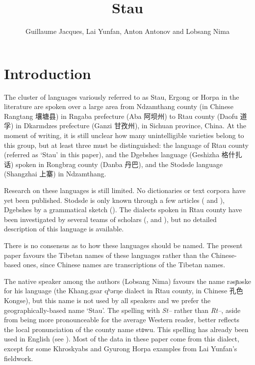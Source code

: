 \documentclass[oneside,a4paper,11pt]{article}
\newcommand{\ipa}[1]{{\phon #1}} %
\newcommand{\zh}[1]{{\cn #1}}
\begin{document}
 


\title{Stau}
\author{Guillaume Jacques, Lai Yunfan, Anton Antonov and Lobsang Nima}

\maketitle
 

\section{Introduction}
The cluster of languages variously referred to as Stau, Ergong or Horpa in the literature are spoken over a large area from Ndzamthang county (in Chinese Rangtang  \zh{壤塘县})  in Rngaba  prefecture (Aba \zh{阿坝州}) to Rtau county (Daofu \zh{道孚}) in Dkarmdzes prefecture (Ganzi \zh{甘孜州}), in Sichuan province, China. At the moment of writing, it is still unclear how many unintelligible varieties belong to this group, but at least three must be distinguished: the language of Rtau county (referred as `Stau' in this paper), and the Dgebshes language (Geshizha \zh{格什扎话})  spoken in Rongbrag county (Danba \zh{丹巴}), and the Stodsde language (Shangzhai \zh{上寨}) in Ndzamthang.  

Research on these languages is still limited. No dictionaries or text corpora have yet been published. Stodsde is only known through a few articles (\citealt{jackson00sidaba} and   \citealt{jackson07shangzhai}), Dgebshes by a grammatical sketch (\citealt{duoerji98geshizha}). The dialects spoken in Rtau county have been investigated by several teams of scholars (\citealt{huangbf91daofu}, \citealt{sun13gexi} and \citealt{jacques14rtau}), but no detailed description of this language is available.

There is no consensus as to how these languages should be named. The present paper favours the Tibetan names of these languages rather than the Chinese-based ones, since Chinese names are transcriptions of the Tibetan names. 

  The native speaker among the authors (Lobsang Nima) favours the name \ipa{rəsɲəske} for his language (the Khang.gsar \ipa{qʰərŋe} dialect in Rtau county, in Chinese \zh{孔色} Kongse), but this name is not used by all speakers and we prefer the geographically-based name  `Stau'. The spelling with \textit{St--} rather than \textit{Rt--}, aside from being more pronounceable for the average Western reader, better reflects the local pronunciation of the county name \ipa{stʚwu}. This spelling has already been used in English (see \citealt{wang70stau}).   Most of the data in these paper come from this dialect, except for some Khroskyabs and Gyurong Horpa examples from Lai Yunfan's fieldwork.
  
\end{document}
